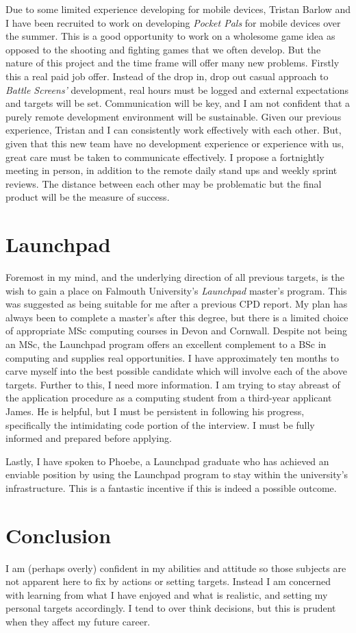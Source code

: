 \documentclass{scrartcl}
\begin{document}
Due to some limited experience developing for mobile devices, Tristan Barlow and I have been recruited to work on developing \textit{Pocket Pals} for mobile devices over the summer. This is a good opportunity to work on a wholesome game idea as opposed to the shooting and fighting games that we often develop. But the nature of this project and the time frame will offer many new problems. Firstly this a real paid job offer. Instead of the drop in, drop out casual approach to \textit{Battle Screens'} development, real hours must be logged and external expectations and targets will be set. Communication will be key, and I am not confident that a purely remote development environment will be sustainable. Given our previous experience, Tristan and I can consistently work effectively with each other. But, given that this new team have no development experience or experience with us, great care must be taken to communicate effectively. I propose a fortnightly meeting in person, in addition to the remote daily stand ups and weekly sprint reviews. The distance between each other may be problematic but the final product will be the measure of success.

\section*{Launchpad}

Foremost in my mind, and the underlying direction of all previous targets, is the wish to gain a place on Falmouth University's \textit{Launchpad} master's program. This was suggested as being suitable for me after a previous CPD report. My plan has always been to complete a master's after this degree, but there is a limited choice of appropriate MSc computing courses in Devon and Cornwall. Despite not being an MSc, the Launchpad program offers an excellent complement to a BSc in computing and supplies real opportunities. I have approximately ten months to carve myself into the best possible candidate which will involve each of the above targets. Further to this, I need more information. I am trying to stay abreast of the application procedure as a computing student from a third-year applicant James. He is helpful, but I must be persistent in following his progress, specifically the intimidating code portion of the interview. I must be fully informed and prepared before applying.

Lastly, I have spoken to Phoebe, a Launchpad graduate who has achieved an enviable position by using the Launchpad program to stay within the university's infrastructure. This is a fantastic incentive if this is indeed a possible outcome.

\section*{Conclusion}

I am (perhaps overly) confident in my abilities and attitude so those subjects are not apparent here to fix by actions or setting targets. Instead I am concerned with learning from what I have enjoyed and what is realistic, and setting my personal targets accordingly. I tend to over think decisions, but this is prudent when they affect my future career.
\end{document}
